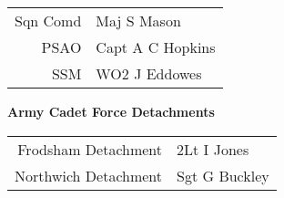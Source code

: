 \begin{center}
  \begin{tabular}{rl}
    Sqn Comd & Maj S Mason \\
    PSAO & Capt A C Hopkins \\
    SSM & WO2 J Eddowes \\
  \end{tabular}
\end{center}

\vspace*{10mm}

\begin{center}
  \Large
  \textbf{Army Cadet Force Detachments}
\end{center}

\begin{center}
  \begin{tabular}{rl}
    Frodsham Detachment & 2Lt I Jones \\
    Northwich Detachment & Sgt G Buckley \\
  \end{tabular}
\end{center}
